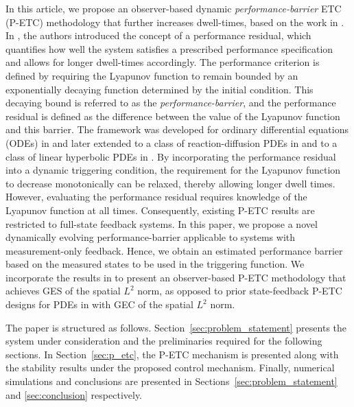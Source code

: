 \documentclass[letterpaper, 10 pt, conference]{ieeeconf}
\begin{document}
In this article, we propose an observer-based dynamic \textit{performance-barrier} ETC (P-ETC) methodology that further increases dwell-times, based on the work in \cite{ong2024performance,rathnayake2025performance,zhang2025performance}. In \cite{ong2024performance}, the authors introduced the concept of a performance residual, which quantifies how well the system satisfies a prescribed performance specification and allows for longer dwell-times accordingly. The performance criterion is defined by requiring the Lyapunov function to remain bounded by an exponentially decaying function determined by the initial condition. This decaying bound is referred to as the \textit{performance-barrier}, and the performance residual is defined as the difference between the value of the Lyapunov function and this barrier. The framework was developed for ordinary differential equations (ODEs) in \cite{ong2024performance} and later extended to a class of reaction-diffusion PDEs in \cite{bhathiya2026_etc_stability} and to a class of linear hyperbolic PDEs in \cite{zhang2025performance}. By incorporating the performance residual into a dynamic triggering condition, the requirement for the Lyapunov function to decrease monotonically can be relaxed, thereby allowing longer dwell times. However, evaluating the performance residual requires knowledge of the Lyapunov function at all times. Consequently, existing P-ETC results are restricted to full-state feedback systems. In this paper, we propose a novel dynamically evolving performance-barrier applicable to systems with measurement-only feedback. Hence, we obtain an estimated performance barrier based on the measured states to be used in the triggering function. We incorporate the results in \cite{bhathiya2026_etc_stability} to present an observer-based P-ETC methodology that achieves GES of the spatial $L^2$ norm, as opposed to prior state-feedback P-ETC designs for PDEs in \cite{rathnayake2025performance,zhang2025performance} with GEC of the spatial $L^2$ norm.

The paper is structured as follows. Section~\ref{sec:problem_statement} presents the system under consideration and the preliminaries required for the following sections. In Section~\ref{sec:p_etc}, the P-ETC mechanism is presented along with the stability results under the proposed control mechanism. Finally, numerical simulations and conclusions are presented in Sections~\ref{sec:problem_statement} and \ref{sec:conclusion} respectively.
\end{document}
